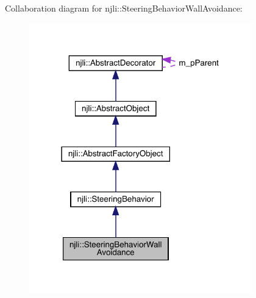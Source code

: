 Collaboration diagram for njli\+:\+:Steering\+Behavior\+Wall\+Avoidance\+:\nopagebreak
\begin{figure}[H]
\begin{center}
\leavevmode
\includegraphics[width=273pt]{classnjli_1_1_steering_behavior_wall_avoidance__coll__graph}
\end{center}
\end{figure}
